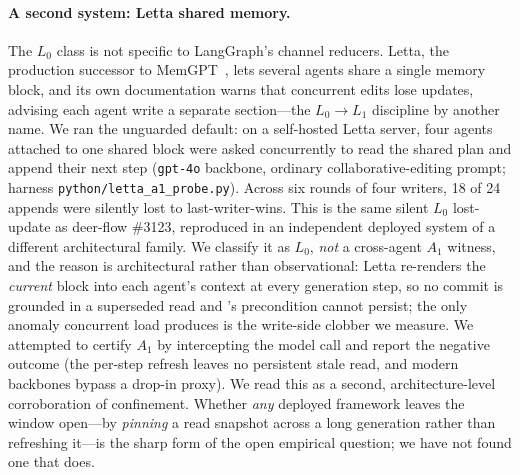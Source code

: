 \documentclass[journal,compsoc,10pt]{IEEEtran}
\providecommand{\citep}{\cite}
\theoremstyle{definition}
\theoremstyle{remark}
\begin{document}
\paragraph{A second system: Letta shared memory.}
The $L_0$ class is not specific to LangGraph's channel reducers. Letta, the
production successor to MemGPT~\citep{PackerEtAl2023MemGPT}, lets several
agents share a single memory block, and its own documentation warns that
concurrent edits lose updates, advising each agent write a separate
section---the $L_0 \rightarrow L_1$ discipline by another name. We ran the
unguarded default: on a self-hosted Letta server, four agents attached to
one shared block were asked concurrently to read the shared plan and append
their next step (\texttt{gpt-4o} backbone, ordinary collaborative-editing
prompt; harness \texttt{python/letta\_a1\_probe.py}). Across six rounds of
four writers, 18 of 24 appends were silently lost to last-writer-wins. This
is the same silent $L_0$ lost-update as deer-flow \#3123, reproduced in an
independent deployed system of a different architectural family. We
classify it as $L_0$, \emph{not} a cross-agent $A_1$ witness, and the
reason is architectural rather than observational: Letta re-renders the
\emph{current} block into each agent's context at every generation step, so
no commit is grounded in a superseded read and 's precondition
cannot persist; the only anomaly concurrent load produces is the write-side
clobber we measure. We attempted to certify $A_1$ by intercepting the model
call and report the negative outcome (the per-step refresh leaves no
persistent stale read, and modern backbones bypass a drop-in proxy). We
read this as a second, architecture-level corroboration of confinement.
Whether \emph{any} deployed framework leaves the window open---by
\emph{pinning} a read snapshot across a long generation rather than
refreshing it---is the sharp form of the open empirical question; we have
not found one that does.
\end{document}
